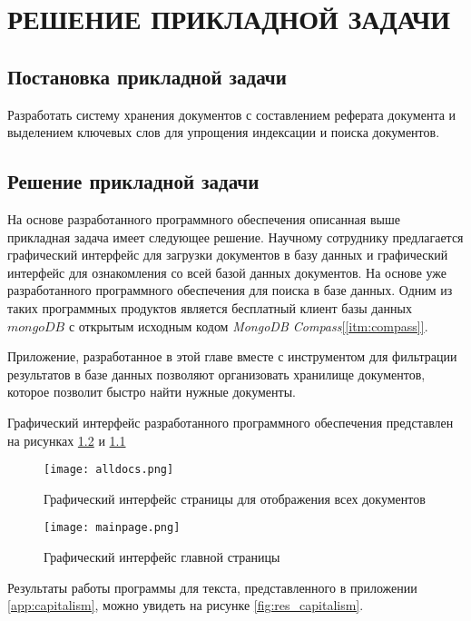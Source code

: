 \chapter{РЕШЕНИЕ ПРИКЛАДНОЙ ЗАДАЧИ}

\section{Постановка прикладной задачи}

Разработать систему хранения  документов с составлением реферата документа и выделением ключевых слов для упрощения индексации и поиска документов. 

\section{Решение прикладной задачи}

На основе разработанного программного обеспечения описанная выше прикладная задача имеет следующее решение. Научному сотруднику предлагается графический интерфейс для загрузки документов в базу данных и графический интерфейс для ознакомления со всей базой данных документов. На основе уже разработанного программного обеспечения для поиска в базе данных. Одним из таких программных продуктов является бесплатный клиент базы данных $mongoDB$ с открытым исходным кодом \textit{MongoDB Compass}\hyperref[itm:compass]{[\ref{itm:compass}]}.

Приложение, разработанное в этой главе вместе с инструментом для фильтрации результатов в базе данных позволяют организовать хранилище документов, которое позволит быстро найти нужные документы.

Графический интерфейс разработанного программного обеспечения представлен на рисунках \hyperref[fig:front_main]{\ref{fig:front_main}} и \hyperref[fig:front_all]{\ref{fig:front_all}}

\begin{figure}[H]
\centering
\texttt{[image: alldocs.png]}
\caption{Графический интерфейс страницы для отображения всех документов}
\label{fig:front_all}
\end{figure}

\begin{figure}[H]
\centering
\texttt{[image: mainpage.png]}
\caption{Графический интерфейс главной страницы}
\label{fig:front_main}
\end{figure}

Результаты работы программы для текста, представленного в приложении \hyperref[app:capitalism]{\ref{app:capitalism}}, можно увидеть на рисунке \hyperref[fig:res_capitalism]{\ref{fig:res_capitalism}}.

